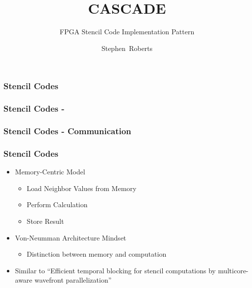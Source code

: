 \documentclass[draft]{beamer}
\title{CASCADE}
\subtitle{FPGA Stencil Code Implementation Pattern}
\author{Stephen~Roberts}
\institute{The University Of Warwick}
\begin{document}
  \frame{\titlepage}
  \begin{frame}
    \frametitle{Stencil Codes}
    \begin{figure}
      \centering
      
    \end{figure}
  \end{frame}

  \begin{frame}
    \frametitle{Stencil Codes - }
    \begin{figure}
      \centering
      
    \end{figure}
  \end{frame}

  \begin{frame}
    \frametitle{Stencil Codes - Communication}
    \begin{figure}
      \centering
      
    \end{figure}
  \end{frame}

  \begin{frame}
    \frametitle{Stencil Codes}
    \begin{itemize}
      \item<1->{Memory-Centric Model}
        \begin{itemize}
          \item{Load Neighbor Values from Memory}
          \item{Perform Calculation}
          \item{Store Result}
        \end{itemize}
      \item<2->{Von-Neumman Architecture Mindset}
        \begin{itemize}
          \item{Distinction between memory and computation}
        \end{itemize}
    \end{itemize}
  \end{frame}

  

  \begin{frame}
    \begin{itemize}
      \item{Similar to ``Efficient temporal blocking for stencil computations by multicore-aware wavefront
      parallelization''}
    \end{itemize}
  \end{frame}
\end{document}
